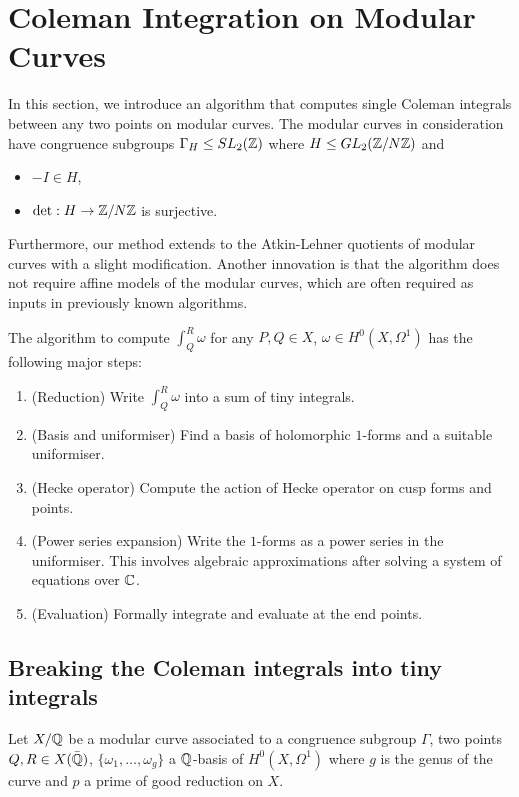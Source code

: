 \chapter{Coleman Integration on Modular Curves}

In this section, we introduce an algorithm that computes single Coleman integrals between any two points on modular curves. The modular curves in consideration have congruence subgroups $\Gamma_H \leq SL_2(\mathbb{Z})$ where $H \leq GL_2(\mathbb{Z}/N\mathbb{Z})$ and

\begin{itemize}
    \item $-I \in H$,
    \item $\det: H \rightarrow \mathbb{Z}/N\mathbb{Z}$ is surjective.
\end{itemize}

Furthermore, our method extends to the Atkin-Lehner quotients of modular curves with a slight modification. Another innovation is that the algorithm does not require affine models of the modular curves, which are often required as inputs in previously known algorithms.

The algorithm to compute $\int_Q^R \omega$ for any $P,Q \in X$, $\omega \in H^0(X, \Omega^1)$ has the following major steps:

\begin{enumerate}
    \item (Reduction) Write $\int_Q^R \omega$ into a sum of tiny integrals.
    \item (Basis and uniformiser) Find a basis of holomorphic $1$-forms and a suitable uniformiser.
    \item (Hecke operator) Compute the action of Hecke operator on cusp forms and points.
    \item (Power series expansion) Write the $1$-forms as a power series in the uniformiser. This involves algebraic approximations after solving a system of equations over $\mathbb{C}$.
    \item (Evaluation) Formally integrate and evaluate at the end points.
\end{enumerate}


\section{Breaking the Coleman integrals into tiny integrals}

Let $X/\mathbb{Q}$ be a modular curve associated to a congruence subgroup $\Gamma$, two points $Q,R \in X(\bar{\mathbb{Q}})$, $\{\omega_1, \ldots, \omega_g\}$ a $\mathbb{Q}$-basis of $H^0(X,\Omega^1)$ where $g$ is the genus of the curve and $p$ a prime of good reduction on $X$.

